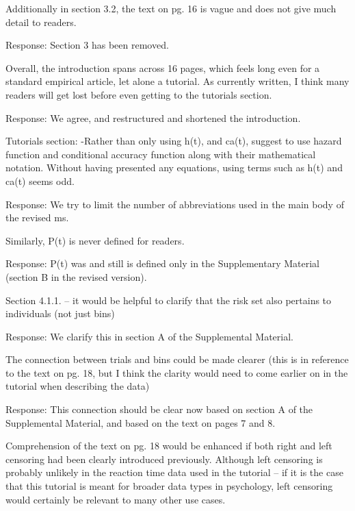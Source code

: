 \documentclass[
]{article}
\renewenvironment{quote}{\begin{leftbar}}{\end{leftbar}}
\begin{document}
\begin{quote}
Additionally in section 3.2, the text on pg. 16 is vague and does not
give much detail to readers.
\end{quote}

Response: Section 3 has been removed.

\begin{quote}
Overall, the introduction spans across 16 pages, which feels long even
for a standard empirical article, let alone a tutorial. As currently
written, I think many readers will get lost before even getting to the
tutorials section.
\end{quote}

Response: We agree, and restructured and shortened the introduction.

\begin{quote}
Tutorials section: -Rather than only using h(t), and ca(t), suggest to
use hazard function and conditional accuracy function along with their
mathematical notation. Without having presented any equations, using
terms such as h(t) and ca(t) seems odd.
\end{quote}

Response: We try to limit the number of abbreviations used in the main
body of the revised ms.

\begin{quote}
Similarly, P(t) is never defined for readers.
\end{quote}

Response: P(t) was and still is defined only in the Supplementary
Material (section B in the revised version).

\begin{quote}
Section 4.1.1. -- it would be helpful to clarify that the risk set also
pertains to individuals (not just bins)
\end{quote}

Response: We clarify this in section A of the Supplemental Material.

\begin{quote}
The connection between trials and bins could be made clearer (this is in
reference to the text on pg. 18, but I think the clarity would need to
come earlier on in the tutorial when describing the data)
\end{quote}

Response: This connection should be clear now based on section A of the
Supplemental Material, and based on the text on pages 7 and 8.

\begin{quote}
Comprehension of the text on pg. 18 would be enhanced if both right and
left censoring had been clearly introduced previously. Although left
censoring is probably unlikely in the reaction time data used in the
tutorial -- if it is the case that this tutorial is meant for broader
data types in psychology, left censoring would certainly be relevant to
many other use cases.
\end{quote}
\end{document}
